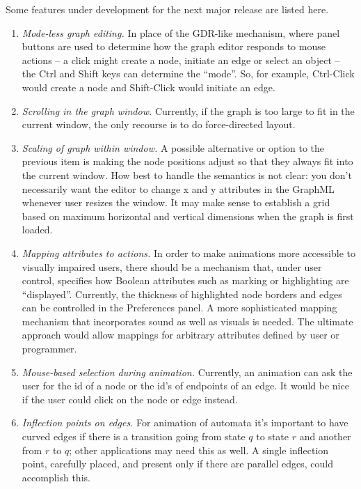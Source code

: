 Some features under development for the next major release are listed here.

\begin{enumerate}
\item
  \emph{Mode-less graph editing.}
  In place of the GDR-like mechanism, where panel buttons are used to determine
  how the graph editor responds to mouse actions -- a click might create a node,
  initiate an edge or select an object --
  the \textsf{Ctrl} and \textsf{Shift} keys can determine the ``mode''.
  So, for example, \textsf{Ctrl-Click} would create a node and
  \textsf{Shift-Click} would initiate an edge.

\item \emph{Scrolling in the graph window.} Currently, if the graph is too
  large to fit in the current window, the only recourse is to do
  force-directed layout.

\item \emph{Scaling of graph within window.} A possible alternative or option
  to the previous item is making the node positions adjust so that they
  always fit into the current window. How best to handle the semantics is not
  clear: you don't necessarily want the editor to change x and y attributes
  in the GraphML whenever user resizes the window. It may make sense to
  establish a grid based on maximum horizontal and vertical dimensions when
  the graph is first loaded.

\item
  \emph{Mapping attributes to actions.}
  In order to make animations more accessible to visually impaired users,
  there should be a mechanism that, under user control, specifies how Boolean
  attributes such as marking or highlighting are ``displayed''.
  Currently, the thickness of highlighted node borders and edges can be
  controlled in the \textsf{Preferences} panel.
  A more sophisticated mapping mechanism that incorporates sound as well as visuals is needed.
  The ultimate approach would allow mappings for arbitrary attributes
  defined by user or programmer.

\item
  \emph{Mouse-based selection during animation.}
  Currently, an animation can ask the user for the id of a node or the id's
  of endpoints of an edge. It would be nice if the user could click on the
  node or edge instead.

\item \emph{Inflection points on edges.}  For animation of automata it's
  important to have curved edges if there is a transition going from state
  $q$ to state $r$ and another from $r$ to $q$; other applications may need
  this as well. A single inflection point, carefully placed, and present only
  if there are parallel edges, could accomplish this.


\end{enumerate}
